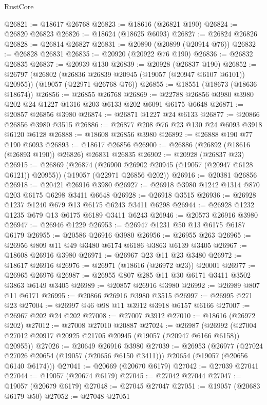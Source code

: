 \begin{lexlean}{RustCore}
\begin{coremodule}
@26821 := @18617 @26768
@26823 := @18616 (@26821 @190)
@26824 := @26820 @26823
@26826 := @18624 (@18625 @6093)
@26827 := @26824 @26826
@26828 := @26814 @26827
@26831 := @20890 (@20899 (@20914 @76))
@26832 := @26828 @26831
@26835 := @20920 (@20922 @76 @190)
@26836 := @26832 @26835
@26837 := @20939 @130
@26839 := @20928 (@26837 @190)
@26852 := @26797
    (@26802 (@26836 @26839 @20945 (@19057 (@20947 @6107 @6101)) @20955))
    (@19057 (@22971 @26768 @76))
@26855 := @18551 (@18673 (@18636 @18674))
@26856 := @26855 @26768
@26869 := @22788 @26856 @3980 @3980 @202 @24 @1227 @1316 @203 @6133 @202 @6091 @6175 @6648
@26871 := @20857 @26856 @3980
@26874 := @26871 @1227 @24 @6133
@26877 := @20866 @26856 @3980 @3515
@26886 := @26877 @208 @76 @23 @130 @24 @6093 @3918 @6120 @6128
@26888 := @18608 @26856 @3980
@26892 := @26888 @190 @77 @190 @6093
@26893 := @18617 @26856
@26900 := @26886 (@26892 (@18616 (@26893 @190)) @26826) @26831 @26835
@26902 := @20928 (@26837 @23)
@26915 := @26869
    (@26874 (@26900 @26902 @20945 (@19057 (@20947 @6128 @6121)) @20955))
    (@19057 (@22971 @26856 @202))
@26916 := @20381 @26856
@26918 := @20421 @26916 @3980
@26927 := @26918 @3980 @1242 @1314 @870 @203 @6175 @6298 @3411 @6648
@26928 := @26918 @3515
@26936 := @26928 @1237 @1240 @679 @13 @6175 @6243 @3411 @6298
@26944 := @26928 @1232 @1235 @679 @13 @6175 @6189 @3411 @6243
@26946 := @20573 @26916 @3980
@26947 := @26946 @1229
@26953 := @26947 @1231 @50 @13 @6175 @6187 @6179
@26955 := @20586 @26916 @3980
@26956 := @26955 @263
@26965 := @26956 @809 @11 @49 @3480 @6174 @6186 @3863 @6139 @3405
@26967 := @18608 @26916 @3980
@26971 := @26967 @23 @11 @23 @3480
@26972 := @18617 @26916
@26976 := @26971 (@18616 (@26972 @23)) @20001
@26977 := @26965 @26976
@26987 := @26955 @807 @285 @11 @30 @6171 @3411 @3502 @3863 @6149 @3405
@26989 := @20857 @26916 @3980
@26992 := @26989 @807 @11 @6171
@26995 := @20866 @26916 @3980 @3515
@26997 := @26995 @271 @23
@27004 := @26997 @46 @98 @11 @3912 @3918 @6157 @6166
@27007 := @26967 @202 @24 @202
@27008 := @27007 @3912
@27010 := @18616 (@26972 @202)
@27012 := @27008 @27010 @20887
@27024 := @26987
    (@26992 (@27004 @27012 @20917 @20925 @21705 @20945 (@19057 (@20947 @6166 @6158)) @20955))
@27026 := @20649 @26916 @3980
@27039 := @26953
    (@26977
      (@27024 @27026 @20654 (@19057 (@20656 @6150 @3411)))
      @20654
      (@19057 (@20656 @6140 @6174)))
@27041 := @20669 (@20670 @6179)
@27042 := @27039 @27041
@27044 := @19057 (@20674 @6179)
@27045 := @27042 @27044
@27047 := @19057 (@20679 @6179)
@27048 := @27045 @27047
@27051 := @19057 (@20683 @6179 @50)
@27052 := @27048 @27051

\end{coremodule}
\end{lexlean}
